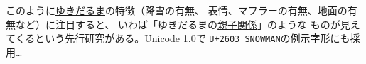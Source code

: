 

\showversion
このように\underline{ゆきだるま}の特徴（降雪の有無、
表情、マフラーの有無、地面の有無など）に注目すると、
いわば「ゆきだるまの\underline{親子関係}」のような
ものが見えてくるという先行研究がある。Unicode 1.0で
\texttt{U+2603 SNOWMAN}の例示字形にも採用…

